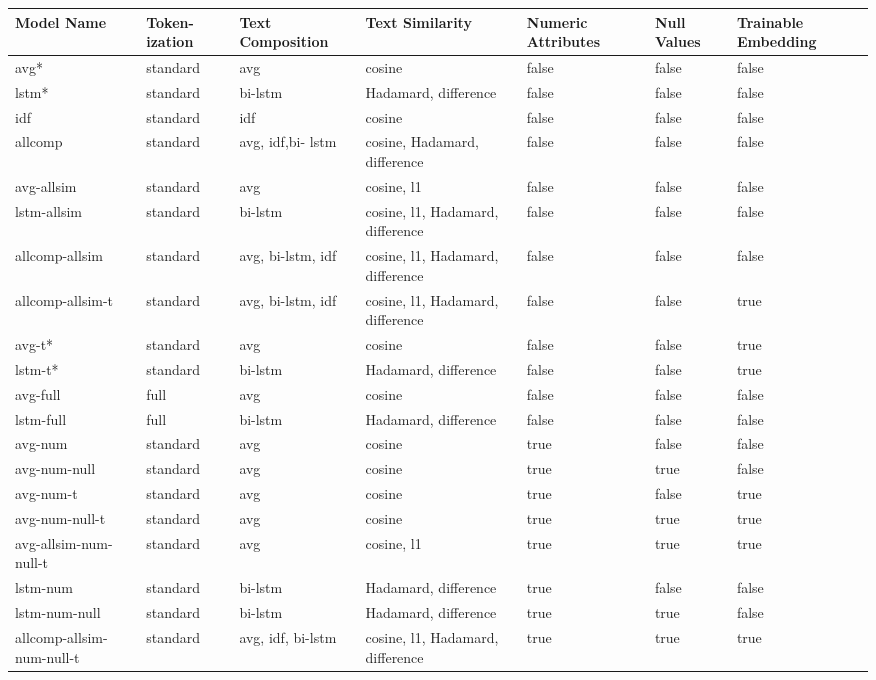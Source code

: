 \documentclass{proc}
\begin{document}
\begin{table}[t]
	\begin{center}
		\begin{tabular}{ |m{2cm}|m{1.5cm}|m{2.5cm}|m{3.5cm}|m{1.5cm}|m{1.5cm}|m{2cm}|} 
				\hline
				\textbf{Model Name} & \textbf{Token-ization} & \textbf{Text Composition} & \textbf{Text Similarity} & \textbf{Numeric Attributes} & \textbf{Null Values} & \textbf{Trainable Embedding}\\
				\hline
				avg* & standard & avg & cosine & false & false & false \\
				\hline
				lstm* & standard &  bi-lstm & Hadamard, difference & false & false & false \\
				\hline
				idf & standard & idf & cosine & false & false & false \\
				\hline
				allcomp & standard & avg, idf,bi- lstm & cosine, Hadamard, difference & false & false & false \\
				\hline
				avg-allsim & standard & avg & cosine, l1 & false & false & false \\				
				\hline
				lstm-allsim & standard & bi-lstm & cosine, l1, Hadamard, difference & false & false & false \\		
				\hline
				allcomp-allsim & standard & avg, bi-lstm, idf & cosine, l1, Hadamard, difference & false & false & false \\
				\hline
				allcomp-allsim-t & standard & avg, bi-lstm, idf & cosine, l1, Hadamard, difference & false & false & true \\
				\hline
				avg-t* & standard & avg & cosine & false & false & true \\
				\hline
				lstm-t* & standard &  bi-lstm & Hadamard, difference & false & false & true \\
				\hline
				avg-full & full & avg & cosine & false & false & false \\
				\hline
				lstm-full & full &  bi-lstm & Hadamard, difference & false & false & false \\
				\hline
				avg-num & standard & avg & cosine & true & false & false \\
				\hline
				avg-num-null & standard & avg & cosine & true & true & false \\
				\hline
				avg-num-t & standard & avg & cosine & true & false & true \\
				\hline
				avg-num-null-t & standard & avg & cosine & true & true & true \\
				\hline
				avg-allsim-num-null-t & standard & avg & cosine, l1 & true & true & true \\
				\hline
				lstm-num & standard &  bi-lstm & Hadamard, difference & true & false & false \\
				\hline
				lstm-num-null & standard &  bi-lstm & Hadamard, difference & true & true & false \\
				\hline
				allcomp-allsim-num-null-t & standard &  avg, idf, bi-lstm & cosine, l1, Hadamard, difference & true & true & true \\
				\hline
				

\end{tabular}
\end{center}
\end{table}
\end{document}
